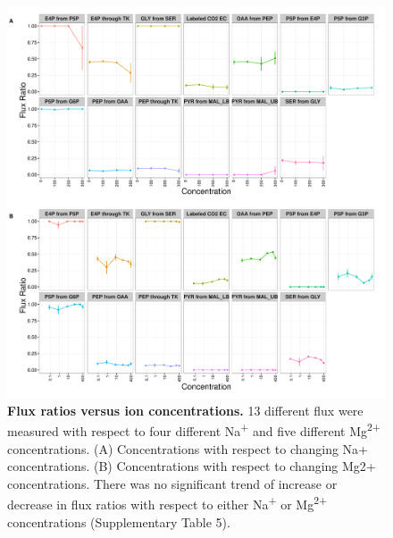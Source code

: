 \documentclass[a4paper]{article}
\begin{document}
\clearpage
\begin{figure}[!htb]
	\includegraphics[width=1\textwidth]{../supplementary_figures/figS23_FluxExp.pdf}
	\caption[Flux ratios versus ion concentrations]
	{\textbf{Flux ratios versus ion concentrations.} 13 different flux were measured with respect to four different Na\textsuperscript{+} and five different Mg\textsuperscript{2+} concentrations. (A) Concentrations with respect to changing Na+ concentrations. (B) Concentrations with respect to changing Mg2+ concentrations. There was no significant trend of increase or decrease in flux ratios with respect to either Na\textsuperscript{+} or Mg\textsuperscript{2+} concentrations (Supplementary Table 5).}
\end{figure}
\end{document}
